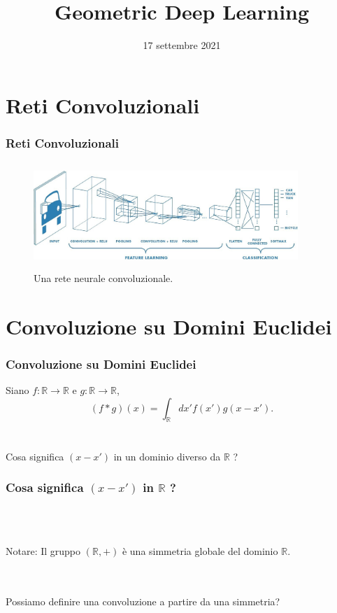 \documentclass[xcolor=dvipsnames]{beamer}
\title{Geometric Deep Learning}
\date{17 settembre 2021}
\newcommand{\R}{\mathbb{R}}
\begin{document}
\frame{\titlepage}

\frame{\tableofcontents}

\section{Reti Convoluzionali}

\begin{frame}
    \frametitle{Reti Convoluzionali}
    \begin{figure}[H]
        \centering
        \includegraphics[width=10cm, height=4cm]{cnn}
        \caption{Una rete neurale convoluzionale.}
    \end{figure}       
\end{frame}

\section{Convoluzione su Domini Euclidei}

\begin{frame}
    \frametitle{Convoluzione su Domini Euclidei}    
    Siano $f:\R \to \R$ e $g:\R \to \R$,
    \[ (f * g)(x) = \int_{\R} dx' f(x')g(x-x'). \]
    \hfill \\
    \hfill \\
    { \large Cosa significa $(x - x')$ in un dominio diverso da $\R$ ?}
\end{frame}

\begin{frame}
    \frametitle{ \large Cosa significa $(x - x')$ \textbf{in} $\R$ ?}
    \hfill \\
    \hfill \\
    \begin{block}{Notare:}
        Il gruppo $(\R, +)$ è una simmetria globale del dominio $\R$.  
    \end{block}
    \hfill \\
    \hfill \\
    {\large Possiamo definire una convoluzione a partire da una simmetria?}
\end{frame}
\end{document}
